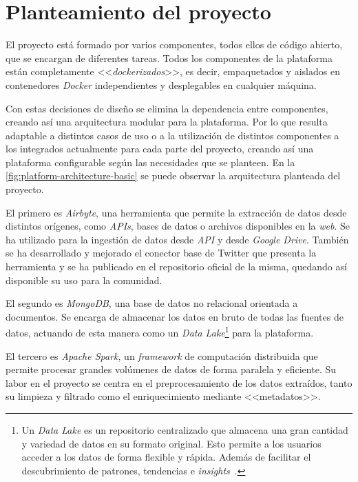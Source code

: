 \section{Planteamiento del proyecto}

El proyecto está formado por varios componentes, todos ellos de código abierto, que se encargan de diferentes tareas. Todos los componentes de la plataforma están completamente <<\textit{dockerizados}>>, es decir, empaquetados y aislados en contenedores \textit{Docker} independientes y desplegables en cualquier máquina.

Con estas decisiones de diseño se elimina la dependencia entre componentes, creando así una arquitectura modular para la plataforma. Por lo que resulta adaptable a distintos casos de uso o a la utilización de distintos componentes a los integrados actualmente para cada parte del proyecto, creando así una plataforma configurable según las necesidades que se planteen. En la \autoref{fig:platform-architecture-basic} se puede observar la arquitectura planteada del proyecto.


El primero es \textit{Airbyte}, una herramienta que permite la extracción de datos desde distintos orígenes, como \textit{APIs}, bases de datos o archivos disponibles en la \textit{web}. Se ha utilizado para la ingestión de datos desde \textit{API} y desde \textit{Google Drive}. También se ha desarrollado y mejorado el conector base de Twitter que presenta la herramienta y se ha publicado en el repositorio oficial de la misma, quedando así disponible su uso para la comunidad.

El segundo es \textit{MongoDB}, una base de datos no relacional orientada a documentos. Se encarga de almacenar los datos en bruto de todas las fuentes de datos, actuando de esta manera como un \textit{Data Lake}\footnote{Un \textit{Data Lake} es un repositorio centralizado que almacena una gran cantidad y variedad de datos en su formato original. Esto permite a los usuarios acceder a los datos de forma flexible y rápida. Además de facilitar el descubrimiento de patrones, tendencias e \textit{insights}~\cite{awsDataLake}.} para la plataforma.

El tercero es \textit{Apache Spark}, un \textit{framework} de computación distribuida que permite procesar grandes volúmenes de datos de forma paralela y eficiente. Su labor en el proyecto se centra en el preprocesamiento de los datos extraídos, tanto su limpieza y filtrado como el enriquecimiento mediante <<metadatos>>.

